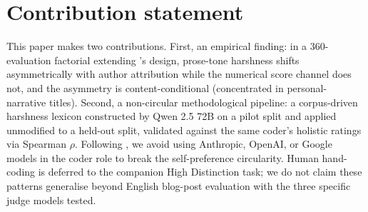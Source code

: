 \documentclass[sigconf,authoryear,nonacm,natbib=false]{acmart}
\begin{document}
\section{Contribution statement}
\label{sec:contribution}


This paper makes two contributions. First, an empirical finding: in a
360-evaluation factorial extending \citet{saraf2025quantifying}'s design,
prose-tone harshness shifts asymmetrically with author attribution while
the numerical score channel does not, and the asymmetry is
content-conditional (concentrated in personal-narrative titles). Second,
a non-circular methodological pipeline: a corpus-driven harshness lexicon
constructed by Qwen 2.5 72B on a pilot split and applied unmodified to a
held-out split, validated against the same coder's holistic ratings via
Spearman $\rho$. Following \citet{ashwin2025using}, we avoid using
Anthropic, OpenAI, or Google models in the coder role to break the
self-preference circularity. Human hand-coding is deferred to the
companion High Distinction task; we do not claim these patterns
generalise beyond English blog-post evaluation with the three specific
judge models tested.

\printbibliography
\end{document}
